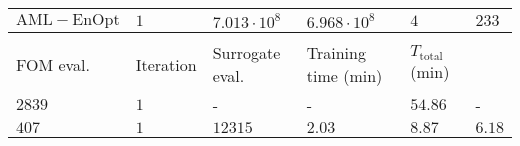 \begin{tabular}{|l|l|l|l|l|l|}
$\mathrm{AML-EnOpt}$ & $1$ & $7.013\cdot10^8$ & $6.968\cdot10^8$ & $4$ & $233$ \\%
\hline
\multicolumn{6}{l}{}\\
\hline
FOM eval. & Iteration & Surrogate eval. & Training time (min) & $T_\mathrm{total}$ (min) &  \\
\hline
\hline
$2839$ & $1$ & - & - & $54.86$ & - \\
$407$ & $1$ & $12315$ & $2.03$ & $8.87$ & $6.18$ \\
\hline
\end{tabular}